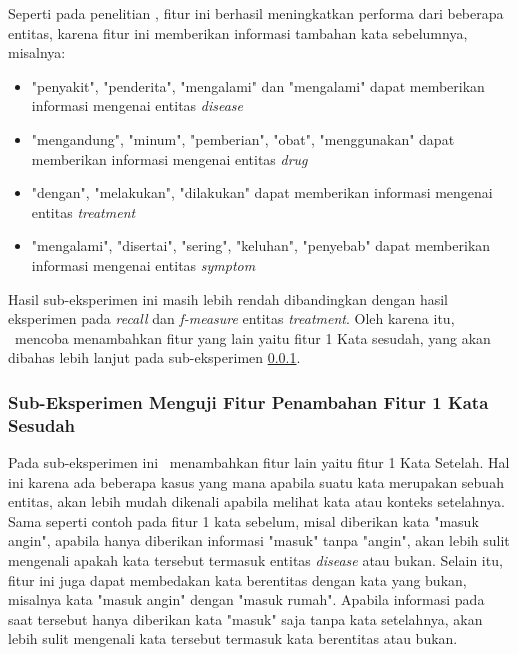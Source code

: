 	Seperti pada penelitian \cite{skripsiKakRadit}, fitur ini berhasil meningkatkan performa dari beberapa entitas, karena fitur ini memberikan informasi tambahan kata sebelumnya, misalnya:
	\begin{itemize}
		\item "penyakit", "penderita", "mengalami" dan "mengalami" dapat memberikan informasi mengenai entitas \textit{disease}
		\item "mengandung", "minum", "pemberian", "obat", "menggunakan" dapat memberikan informasi mengenai entitas \textit{drug}
		\item "dengan", "melakukan", "dilakukan" dapat memberikan informasi mengenai entitas \textit{treatment}
		\item "mengalami", "disertai", "sering", "keluhan", "penyebab" dapat memberikan informasi mengenai entitas \textit{symptom}
	\end{itemize}
	
	Hasil sub-eksperimen ini masih lebih rendah dibandingkan dengan hasil eksperimen \cite{skripsiKakRadit} pada \textit{recall} dan \textit{f-measure} entitas \textit{treatment}. Oleh karena itu, \saya~mencoba menambahkan fitur yang lain yaitu fitur 1 Kata sesudah, yang akan dibahas lebih lanjut pada sub-eksperimen \ref{eks:subekswaf1}.
	
	
	\subsubsection{Sub-Eksperimen Menguji Fitur Penambahan Fitur 1 Kata Sesudah}\label{eks:subekswaf1}
	Pada sub-eksperimen ini \saya~menambahkan fitur lain yaitu fitur 1 Kata Setelah. Hal ini karena ada beberapa kasus yang mana apabila suatu kata merupakan sebuah entitas, akan lebih mudah dikenali apabila melihat kata atau konteks setelahnya. Sama seperti contoh pada fitur 1 kata sebelum, misal diberikan kata "masuk angin", apabila hanya diberikan informasi "masuk" tanpa "angin", akan lebih sulit mengenali apakah kata tersebut termasuk entitas \textit{disease} atau bukan. Selain itu, fitur ini juga dapat membedakan kata berentitas dengan kata yang bukan, misalnya kata "masuk angin" dengan "masuk rumah". Apabila informasi pada saat tersebut hanya diberikan kata "masuk" saja tanpa kata setelahnya, akan lebih sulit mengenali kata tersebut termasuk kata berentitas atau bukan.
	
